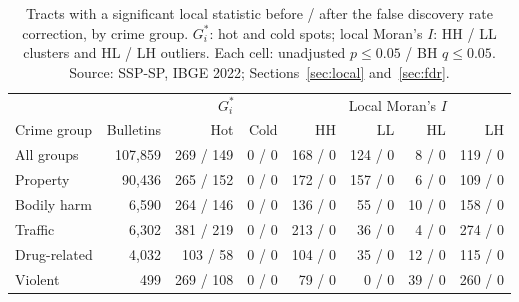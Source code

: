 \begin{table}[!ht]
\caption{Tracts with a significant local statistic before / after the false discovery rate correction, by crime group. $G_i^*$: hot and cold spots; local Moran's $I$: HH / LL clusters and HL / LH outliers. Each cell: unadjusted $p \le 0.05$ / BH $q \le 0.05$. Source: SSP-SP, IBGE 2022; Sections~\ref{sec:local} and~\ref{sec:fdr}.}
\label{tab:localfdr}
\centering\footnotesize
\begin{tabular}{@{}lrrrrrrr@{}}
\hline\hline
 & & \multicolumn{2}{c}{$G_i^*$} & \multicolumn{4}{c}{Local Moran's $I$} \\
Crime group & Bulletins & Hot & Cold & HH & LL & HL & LH \\
\hline
All groups & 107,859 & 269 / 149 & 0 / 0 & 168 / 0 & 124 / 0 & 8 / 0 & 119 / 0 \\
Property & 90,436 & 265 / 152 & 0 / 0 & 172 / 0 & 157 / 0 & 6 / 0 & 109 / 0 \\
Bodily harm & 6,590 & 264 / 146 & 0 / 0 & 136 / 0 & 55 / 0 & 10 / 0 & 158 / 0 \\
Traffic & 6,302 & 381 / 219 & 0 / 0 & 213 / 0 & 36 / 0 & 4 / 0 & 274 / 0 \\
Drug-related & 4,032 & 103 / 58 & 0 / 0 & 104 / 0 & 35 / 0 & 12 / 0 & 115 / 0 \\
Violent & 499 & 269 / 108 & 0 / 0 & 79 / 0 & 0 / 0 & 39 / 0 & 260 / 0 \\
\hline\hline
\end{tabular}
\end{table}
